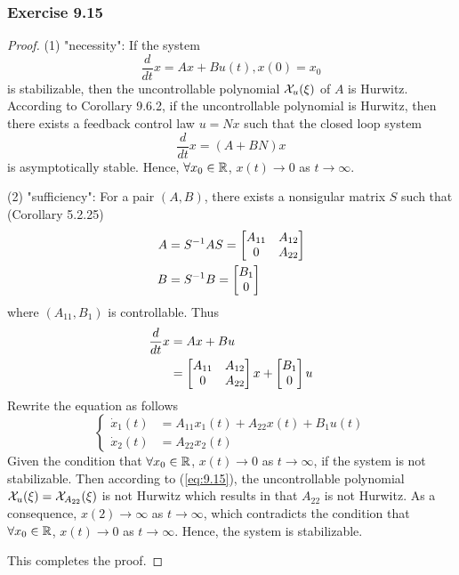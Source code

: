 \subsubsection{Exercise 9.15}
\begin{proof}

(1) "necessity": If the system
\begin{equation}
    \frac{d}{dt}x = Ax + Bu(t), x(0) = x_0
\end{equation}
is  stabilizable, then the uncontrollable polynomial $\mathcal{X}_u(\xi)$ of $A$ is Hurwitz. According to Corollary 9.6.2, if the uncontrollable polynomial is Hurwitz, then there exists a feedback control law $u=Nx$ such that the closed loop system
\begin{equation}
    \frac{d}{dt}x = (A+BN)x
\end{equation}
is asymptotically stable. Hence, $\forall x_0\in\mathbb{R}$, $x(t)\rightarrow 0$ as $t \rightarrow \infty$.

(2) "sufficiency": For a pair $(A,B)$, there exists a nonsigular matrix $S$ such that (Corollary 5.2.25)
\begin{align}
    A &= S^{-1}AS = \begin{bmatrix} A_{11} &A_{12} \\ 0 &A_{22} \end{bmatrix} \\
    B &= S^{-1}B = \begin{bmatrix} B_1 \\ 0 \end{bmatrix}
\end{align}
where $(A_{11},B_1)$ is controllable. Thus
\begin{equation}
    \begin{aligned}
        \frac{d}{dt}x &= Ax + Bu \\
        &= \begin{bmatrix} A_{11} &A_{12} \\ 0 &A_{22} \end{bmatrix} x + \begin{bmatrix} B_1 \\ 0 \end{bmatrix} u
    \end{aligned}
\end{equation}
Rewrite the equation as follows
\begin{equation}\label{eq:9.15}
    \begin{cases}
        \dot{x}_1(t) &= A_{11}x_1(t) + A_{22}x(t) +B_1u(t) \\
        \dot{x}_2(t) &= A_{22}x_2(t)
    \end{cases}
\end{equation}
Given the condition that $\forall x_0\in\mathbb{R}$, $x(t)\rightarrow 0$ as $t \rightarrow \infty$, if the system is not stabilizable. Then according to (\ref{eq:9.15}), the uncontrollable polynomial $\mathcal{X}_u(\xi) = \mathcal{X}_{A_{22}}(\xi)$ is not Hurwitz which results in that $A_{22}$ is not Hurwitz. As a consequence, $x(2)\rightarrow\infty$ as $t\rightarrow\infty$, which contradicts the condition that $\forall x_0\in\mathbb{R}$, $x(t)\rightarrow 0$ as $t \rightarrow \infty$. Hence, the system is stabilizable.

This completes the proof.
    
\end{proof}



